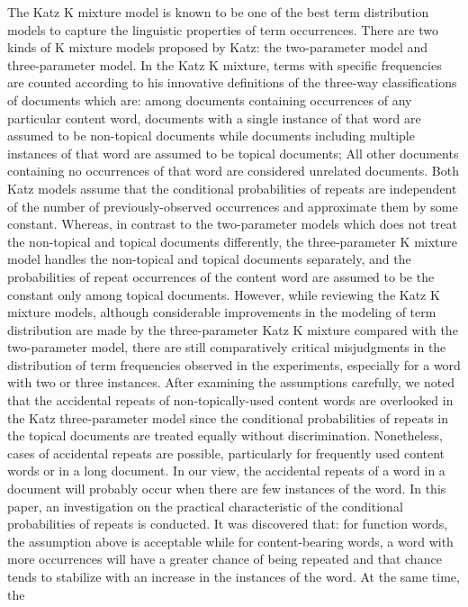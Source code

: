 \documentclass[english]{jnlp_1.4_rep}
\begin{document}
The Katz K mixture model \cite{Katz96} is known to be one of the best term distribution models to capture the linguistic properties of term
occurrences. There are two kinds of K mixture models proposed by Katz: the two-parameter model and three-parameter model. In the Katz K mixture,
terms with specific frequencies are counted according to his innovative definitions of the three-way classifications of documents which are: among
documents containing occurrences of any particular content word, documents with a single instance of that word are assumed to be non-topical
documents while documents including multiple instances of that word are assumed to be topical documents; All other documents containing no
occurrences of that word are considered unrelated documents. Both Katz models assume that the conditional probabilities of repeats are independent
of the number of previously-observed occurrences and approximate them by some constant. Whereas, in contrast to the two-parameter models which does
not treat the non-topical and topical documents differently, the three-parameter K mixture model handles the non-topical and topical documents
separately, and the probabilities of repeat occurrences of the content word are assumed to be the constant only among topical documents. However,
while reviewing the Katz K mixture models, although considerable improvements in the modeling of term distribution are made by the three-parameter
Katz K mixture compared with the two-parameter model, there are still comparatively critical misjudgments in the distribution of term frequencies
observed in the experiments, especially for a word with two or three instances. After examining the assumptions carefully, we noted that the
accidental repeats of non-topically-used content words are overlooked in the Katz three-parameter model since the conditional probabilities of
repeats in the topical documents are treated equally without discrimination. Nonetheless, cases of accidental repeats are possible, particularly for
frequently used content words or in a long document. In our view, the accidental repeats of a word in a document will probably occur when there are
few instances of the word. In this paper, an investigation on the practical characteristic of the conditional probabilities of repeats is conducted.
It was discovered that: for function words, the assumption above is acceptable while for content-bearing words, a word with more occurrences will
have a greater chance of being repeated and that chance tends to stabilize with an increase in the instances of the word. At the same time, the
\end{document}
